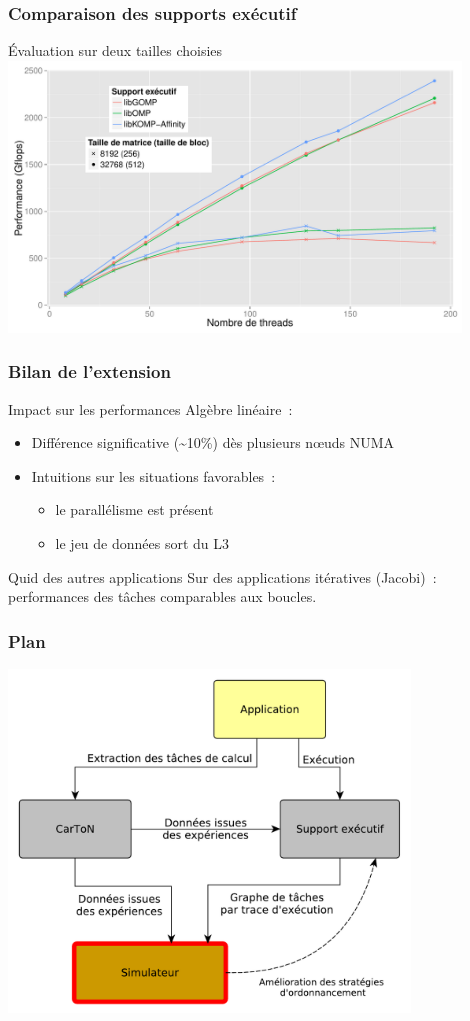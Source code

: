 \documentclass[xcolor={usenames,dvipsnames,svgnames,table}, aspectratio=43]{beamer}
\begin{document}
\begin{frame}
  \frametitle{Comparaison des supports exécutif}
  Évaluation sur deux tailles choisies
  \includegraphics[width=0.9\textwidth]{graph/graph_all_cholesky_idchire.pdf}
\end{frame}

\begin{frame}
  \frametitle{Bilan de l'extension}

  \begin{block}{Impact sur les performances}
    Algèbre linéaire~:
    \begin{itemize}
      \item Différence significative (\textasciitilde 10\%) dès plusieurs nœuds NUMA
      \item Intuitions sur les situations favorables~:
      \begin{itemize}
	\item le parallélisme est présent
	\item le jeu de données sort du L3
      \end{itemize}
    \end{itemize}
  \end{block}

  \begin{block}{Quid des autres applications}
    Sur des applications itératives (Jacobi)~: performances des tâches comparables aux boucles.
  \end{block}
\end{frame}


\begin{frame}
  \frametitle{Plan}
  \includegraphics[width=0.8\textwidth]{graph/big_picture-part3.pdf}
\end{frame}
\end{document}
